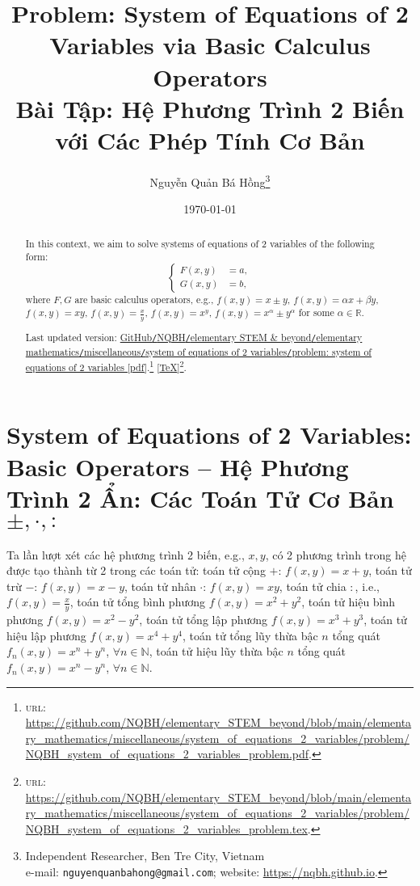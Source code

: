\documentclass{article}
\title{Problem: System of Equations of 2 Variables via Basic Calculus Operators\\Bài Tập: Hệ Phương Trình 2 Biến với Các Phép Tính Cơ Bản}
\author{Nguyễn Quản Bá Hồng\footnote{Independent Researcher, Ben Tre City, Vietnam\\e-mail: \texttt{nguyenquanbahong@gmail.com}; website: \url{https://nqbh.github.io}.}}
\date{\today}
\begin{document}
\maketitle
\begin{abstract}
	In this context, we aim to solve systems of equations of 2 variables of the following form:
	\begin{equation*}
		\left\{\begin{split}
			F(x,y) &= a,\\
			G(x,y) & = b,
		\end{split}\right.
	\end{equation*}
	where $F,G$ are basic calculus operators, e.g., $f(x,y) = x\pm y$, $f(x,y) = \alpha x + \beta y$, $f(x,y) = xy$, $f(x,y) = \frac{x}{y}$, $f(x,y) = x^y$, $f(x,y) = x^\alpha\pm y^\alpha$ for some $\alpha\in\mathbb{R}$.
	
	Last updated version: \href{https://github.com/NQBH/elementary_STEM_beyond/blob/main/elementary_mathematics/miscellaneous/system_of_equations_2_variables/problem/NQBH_system_of_equations_2_variables_problem.pdf}{GitHub{\tt/}NQBH{\tt/}elementary STEM \& beyond{\tt/}elementary mathematics{\tt/}miscellaneous{\tt/}system of equations of 2 variables{\tt/}problem: system of equations of 2 variables [pdf]}.\footnote{\textsc{url}: \url{https://github.com/NQBH/elementary_STEM_beyond/blob/main/elementary_mathematics/miscellaneous/system_of_equations_2_variables/problem/NQBH_system_of_equations_2_variables_problem.pdf}.} [\href{https://github.com/NQBH/elementary_STEM_beyond/blob/main/elementary_mathematics/miscellaneous/system_of_equations_2_variables/problem/NQBH_system_of_equations_2_variables_problem.tex}{\TeX}]\footnote{\textsc{url}: \url{https://github.com/NQBH/elementary_STEM_beyond/blob/main/elementary_mathematics/miscellaneous/system_of_equations_2_variables/problem/NQBH_system_of_equations_2_variables_problem.tex}.}.
\end{abstract}
\tableofcontents


\section{System of Equations of 2 Variables: Basic Operators -- Hệ Phương Trình 2 Ẩn: Các Toán Tử Cơ Bản $\pm,\cdot,:$}
Ta lần lượt xét các hệ phương trình 2 biến, e.g., $x,y$, có 2 phương trình trong hệ được tạo thành từ 2 trong các toán tử: toán tử cộng $+$: $f(x,y) = x + y$, toán tử trừ $-$: $f(x,y) = x - y$, toán tử nhân $\cdot$: $f(x,y) = xy$, toán tử chia $:$, i.e., $f(x,y) = \frac{x}{y}$, toán tử tổng bình phương $f(x,y) = x^2 + y^2$, toán tử hiệu bình phương $f(x,y) = x^2 - y^2$, toán tử tổng lập phương $f(x,y) = x^3 + y^3$, toán tử hiệu lập phương $f(x,y) = x^4 + y^4$, toán tử tổng lũy thừa bậc $n$ tổng quát $f_n(x,y) = x^n + y^n$, $\forall n\in\mathbb{N}$, toán tử hiệu lũy thừa bậc $n$ tổng quát $f_n(x,y) = x^n - y^n$, $\forall n\in\mathbb{N}$.
\end{document}
